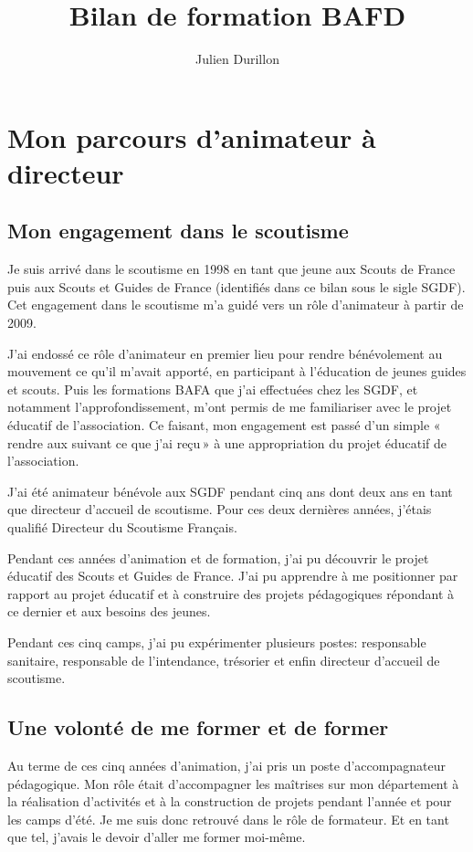 \documentclass[titlepage,11pt,a4paper]{article}
\title{Bilan de formation BAFD}
\author{Julien Durillon}
\begin{document}
\maketitle


\section{Mon parcours d'animateur à directeur}

\subsection{Mon engagement dans le scoutisme}

Je suis arrivé dans le scoutisme en 1998 en tant que jeune aux Scouts de France puis aux Scouts et Guides
de France (identifiés dans ce bilan sous le sigle SGDF). Cet engagement dans le scoutisme
m'a guidé vers un rôle d'animateur à partir de 2009.

J'ai endossé ce rôle d'animateur en premier lieu pour rendre bénévolement au mouvement ce
qu'il m'avait apporté, en participant à l'éducation de jeunes guides et scouts. Puis les
formations BAFA que j'ai effectuées chez les SGDF, et notamment l'approfondissement, m'ont
permis de me familiariser avec le projet éducatif de l'association. Ce faisant, mon
engagement est passé d'un simple «\,rendre aux suivant ce que j'ai reçu\,» à une
appropriation du projet éducatif de l'association.

J'ai été animateur bénévole aux SGDF pendant cinq ans dont deux ans en tant que directeur
d'accueil de scoutisme. Pour ces deux dernières années, j'étais qualifié Directeur du Scoutisme Français.

Pendant ces années d'animation et de formation, j'ai pu découvrir le projet éducatif des
Scouts et Guides de France. J'ai pu apprendre à me positionner par rapport au projet
éducatif et à construire des projets pédagogiques répondant à ce dernier et aux besoins
des jeunes.

Pendant ces cinq camps, j'ai pu expérimenter plusieurs postes: responsable sanitaire,
responsable de l'intendance, trésorier et enfin directeur d'accueil de scoutisme.

\subsection{Une volonté de me former et de former}

Au terme de ces cinq années d'animation, j'ai pris un poste d'accompagnateur pédagogique.
Mon rôle était d'accompagner les maîtrises sur mon département à la réalisation
d'activités et à la construction de projets pendant l'année et pour les camps d'été.
Je me suis donc retrouvé dans le rôle de formateur. Et en tant que tel, j'avais le
devoir d'aller me former moi-même.
\end{document}
